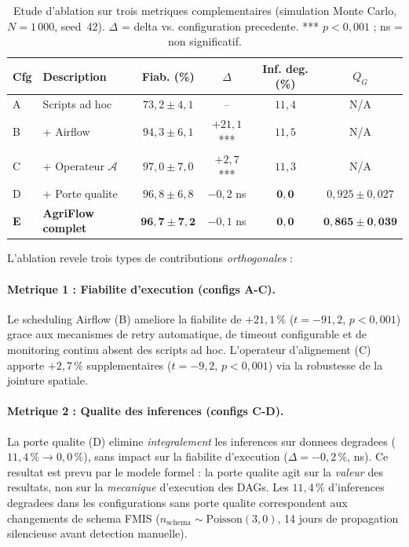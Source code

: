 \documentclass[12pt,a4paper]{article}
\theoremstyle{plain}
\theoremstyle{definition}
\theoremstyle{remark}
\begin{document}
	\begin{table}[H]
		\caption{Etude d'ablation sur trois metriques complementaires
			(simulation Monte Carlo, $N=1\,000$, seed~42).
			$\Delta$ = delta vs. configuration precedente.
			*** $p<0{,}001$ ; ns = non significatif.}
		\label{tab:ablation}
		\centering\small
		\renewcommand{\arraystretch}{1.38}
		\begin{tabularx}{\linewidth}{llcccc}
			\toprule
			\textbf{Cfg} & \textbf{Description} &
			\textbf{Fiab. (\%)} & \textbf{$\Delta$} &
			\textbf{Inf. deg. (\%)} & \textbf{$Q_G$} \\
			\midrule
			\rowcolor{lightblue!30}
			A & Scripts ad hoc    & $73{,}2\pm4{,}1$  & --           & $11{,}4$ & N/A \\
			B & + Airflow         & $94{,}3\pm6{,}1$  & $+21{,}1$*** & $11{,}5$ & N/A \\
			\rowcolor{lightblue!30}
			C & + Operateur $\mathcal{A}$ & $97{,}0\pm7{,}0$ & $+2{,}7$*** & $11{,}3$ & N/A \\
			D & + Porte qualite   & $96{,}8\pm6{,}8$  & $-0{,}2$ ns  & $\mathbf{0{,}0}$ & $0{,}925\pm0{,}027$ \\
			\rowcolor{lightgreen!50}
			\textbf{E} & \textbf{AgriFlow complet} & $\mathbf{96{,}7\pm7{,}2}$ & $-0{,}1$ ns & $\mathbf{0{,}0}$ & $\mathbf{0{,}865\pm0{,}039}$ \\
			\bottomrule
		\end{tabularx}
	\end{table}
	
	L'ablation revele trois types de contributions \emph{orthogonales} :
	
	\paragraph{Metrique 1 : Fiabilite d'execution (configs A-C).}
	Le scheduling Airflow (B) ameliore la fiabilite de $+21{,}1\,\%$
	($t=-91{,}2$, $p<0{,}001$) grace aux mecanismes de retry automatique,
	de timeout configurable et de monitoring continu absent des scripts ad hoc.
	L'operateur d'alignement (C) apporte $+2{,}7\,\%$ supplementaires
	($t=-9{,}2$, $p<0{,}001$) via la robustesse de la jointure spatiale.
	
	\paragraph{Metrique 2 : Qualite des inferences (configs C-D).}
	La porte qualite (D) elimine \emph{integralement} les inferences sur
	donnees degradees ($11{,}4\,\% \to 0{,}0\,\%$), sans impact sur la
	fiabilite d'execution ($\Delta = -0{,}2\,\%$, ns).
	Ce resultat est prevu par le modele formel : la porte qualite agit
	sur la \emph{valeur} des resultats, non sur la \emph{mecanique}
	d'execution des DAGs.
	Les $11{,}4\,\%$ d'inferences degradees dans les configurations sans
	porte qualite correspondent aux changements de schema FMIS
	($n_{\text{schema}} \sim \text{Poisson}(3{,}0)$, 14 jours de
	propagation silencieuse avant detection manuelle).
	
\end{document}
